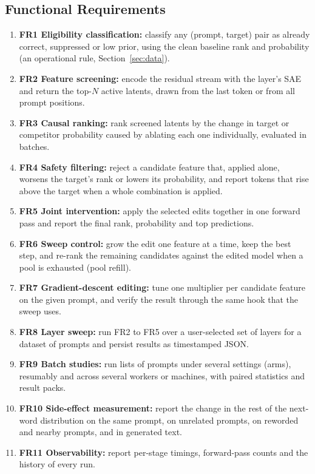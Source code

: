 \documentclass[12pt,a4paper]{report}
\begin{document}
\subsection{Functional Requirements}

\begin{enumerate}
  \item \textbf{FR1 Eligibility classification:} classify any (prompt, target) pair as already correct, suppressed or low prior, using the clean baseline rank and probability (an operational rule, Section~\ref{sec:data}).
  \item \textbf{FR2 Feature screening:} encode the residual stream with the layer's SAE and return the top-$N$ active latents, drawn from the last token or from all prompt positions.
  \item \textbf{FR3 Causal ranking:} rank screened latents by the change in target or competitor probability caused by ablating each one individually, evaluated in batches.
  \item \textbf{FR4 Safety filtering:} reject a candidate feature that, applied alone, worsens the target's rank or lowers its probability, and report tokens that rise above the target when a whole combination is applied.
  \item \textbf{FR5 Joint intervention:} apply the selected edits together in one forward pass and report the final rank, probability and top predictions.
  \item \textbf{FR6 Sweep control:} grow the edit one feature at a time, keep the best step, and re-rank the remaining candidates against the edited model when a pool is exhausted (pool refill).
  \item \textbf{FR7 Gradient-descent editing:} tune one multiplier per candidate feature on the given prompt, and verify the result through the same hook that the sweep uses.
  \item \textbf{FR8 Layer sweep:} run FR2 to FR5 over a user-selected set of layers for a dataset of prompts and persist results as timestamped JSON.
  \item \textbf{FR9 Batch studies:} run lists of prompts under several settings (arms), resumably and across several workers or machines, with paired statistics and result packs.
  \item \textbf{FR10 Side-effect measurement:} report the change in the rest of the next-word distribution on the same prompt, on unrelated prompts, on reworded and nearby prompts, and in generated text.
  \item \textbf{FR11 Observability:} report per-stage timings, forward-pass counts and the history of every run.
\end{enumerate}
\end{document}
